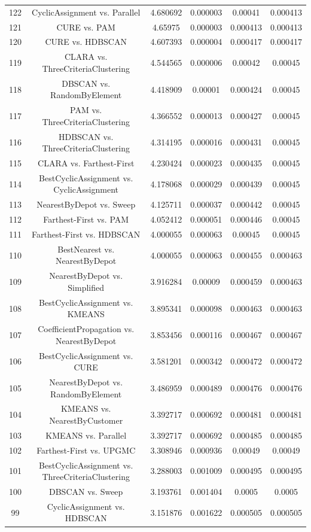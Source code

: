 \documentclass[a4paper,10pt]{article}
\begin{document}
\begin{landscape}
\begin{table}[!htp]
\begin{tabular}{cccccc}
122&CyclicAssignment vs. Parallel&4.680692&0.000003&0.00041&0.000413\\
121&CURE vs. PAM&4.65975&0.000003&0.000413&0.000413\\
120&CURE vs. HDBSCAN&4.607393&0.000004&0.000417&0.000417\\
119&CLARA vs. ThreeCriteriaClustering&4.544565&0.000006&0.00042&0.00045\\
118&DBSCAN vs. RandomByElement&4.418909&0.00001&0.000424&0.00045\\
117&PAM vs. ThreeCriteriaClustering&4.366552&0.000013&0.000427&0.00045\\
116&HDBSCAN vs. ThreeCriteriaClustering&4.314195&0.000016&0.000431&0.00045\\
115&CLARA vs. Farthest-First&4.230424&0.000023&0.000435&0.00045\\
114&BestCyclicAssignment vs. CyclicAssignment&4.178068&0.000029&0.000439&0.00045\\
113&NearestByDepot vs. Sweep&4.125711&0.000037&0.000442&0.00045\\
112&Farthest-First vs. PAM&4.052412&0.000051&0.000446&0.00045\\
111&Farthest-First vs. HDBSCAN&4.000055&0.000063&0.00045&0.00045\\
110&BestNearest vs. NearestByDepot&4.000055&0.000063&0.000455&0.000463\\
109&NearestByDepot vs. Simplified&3.916284&0.00009&0.000459&0.000463\\
108&BestCyclicAssignment vs. KMEANS&3.895341&0.000098&0.000463&0.000463\\
107&CoefficientPropagation vs. NearestByDepot&3.853456&0.000116&0.000467&0.000467\\
106&BestCyclicAssignment vs. CURE&3.581201&0.000342&0.000472&0.000472\\
105&NearestByDepot vs. RandomByElement&3.486959&0.000489&0.000476&0.000476\\
104&KMEANS vs. NearestByCustomer&3.392717&0.000692&0.000481&0.000481\\
103&KMEANS vs. Parallel&3.392717&0.000692&0.000485&0.000485\\
102&Farthest-First vs. UPGMC&3.308946&0.000936&0.00049&0.00049\\
101&BestCyclicAssignment vs. ThreeCriteriaClustering&3.288003&0.001009&0.000495&0.000495\\
100&DBSCAN vs. Sweep&3.193761&0.001404&0.0005&0.0005\\
99&CyclicAssignment vs. HDBSCAN&3.151876&0.001622&0.000505&0.000505\\

\end{tabular}
\end{table}
\end{landscape}
\end{document}
